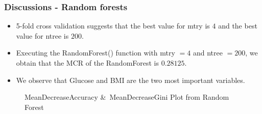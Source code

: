 \documentclass{beamer}
\begin{document}
\begin{frame}
    \frametitle{Discussions - Random forests}
        \begin{itemize}
            \setlength\itemsep{1em}
            \item 5-fold cross validation suggests that the best value for mtry is $4$ and the best value for ntree is $200$.
            \item Executing the RandomForest()  function with mtry $=4$ and ntree $=200$, we obtain that the MCR of the RandomForest is $0.28125$.
            \item We observe that Glucose and BMI are the two most important variables.
        \end{itemize}
        \begin{figure}[h!]
            \centering
            \caption{MeanDecreaseAccuracy {\&}\ MeanDecreaseGini Plot from Random Forest} 
            \label{fig:RFPlot}
        \end{figure}
\end{frame}
\end{document}

